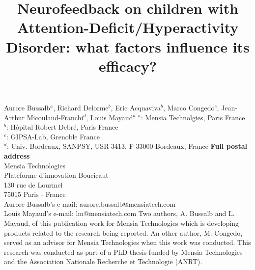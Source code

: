 

\title{Neurofeedback on children with Attention-Deficit/Hyperactivity Disorder: what factors influence its efficacy?} %
\maketitle
Aurore Bussalb$^a$, Richard Delorme$^b$, Eric Acquaviva$^b$, Marco Congedo$^c$, Jean-Arthur Micoulaud-Franchi$^d$, Louis Mayaud$^a$ 
\smallbreak
\noindent $^a$: Mensia Technolgies, Paris France \\
\noindent $^b$: Hôpital Robert Debré, Paris France \\ %
\noindent $^c$: GIPSA-Lab, Grenoble France \\
\noindent $^d$: Univ. Bordeaux, SANPSY, USR 3413, F-33000 Bordeaux, France 
\smallbreak
\noindent\textbf{Full postal address} \\
Mensia Technologies \\
Plateforme d'innovation Boucicaut \\
130 rue de Lourmel \\
75015 Paris - France \\
Aurore Bussalb's e-mail: aurore.bussalb@mensiatech.com \\
Louis Mayaud's e-mail: lm@mensiatech.com 
\smallbreak
Two authors, A. Bussalb and L. Mayaud, of this publication work for Mensia Technologies which is developing products related to the research being reported.
An other author, M. Congedo, served as an advisor for Mensia Technologies when this work was conducted. 
\smallbreak
This research was conducted as part of a PhD thesis funded by Mensia Technologies and the Association Nationale Recherche et Technologie (ANRT).